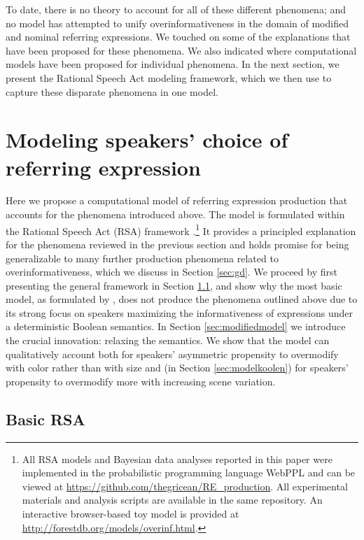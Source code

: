 \documentclass[11pt]{article}
\newcommand{\sectionref}[1]{Section \ref{#1}}
\begin{document}
To date, there is no theory to account for all of these different phenomena; and no model has attempted to unify overinformativeness in the domain of modified and nominal referring expressions. We touched on some of the explanations that have been proposed for these phenomena. We also indicated where computational models have been proposed for individual phenomena. In the next section, we present the Rational Speech Act modeling framework, which we then use to capture these disparate phenomena in one model.


\section[]{Modeling speakers' choice of referring expression}
\label{sec:models}

Here we propose a computational model of referring expression production that accounts for the phenomena introduced above. The model is formulated within the Rational Speech Act (RSA) framework \cite{frank2012, goodman2016}.\footnote{All RSA models and Bayesian data analyses reported in this paper were implemented in the probabilistic programming language WebPPL \cite{GoodmanStuhlmuller14_DIPPL} and can be viewed at \url{https://github.com/thegricean/RE_production}. All experimental materials and analysis scripts are available in the same repository. An interactive browser-based toy model is provided at \url{http://forestdb.org/models/overinf.html}.} It provides a principled explanation for the phenomena reviewed in the previous section and  holds promise for being generalizable to many further production phenomena related to overinformativeness, which we discuss in \sectionref{sec:gd}. We proceed by first presenting the general framework in \sectionref{sec:basicrsa}, and show why the most basic model, as formulated by , does not produce the phenomena outlined above due to its strong focus on speakers maximizing the informativeness of expressions under a deterministic Boolean semantics. In \sectionref{sec:modifiedmodel} we introduce the crucial innovation: relaxing the semantics. We show that the model can qualitatively account both for speakers' asymmetric propensity to overmodify with color rather than with size and (in \sectionref{sec:modelkoolen}) for speakers' propensity to overmodify more with increasing scene variation. 

\subsection{Basic RSA}
\label{sec:basicrsa}
\end{document}
